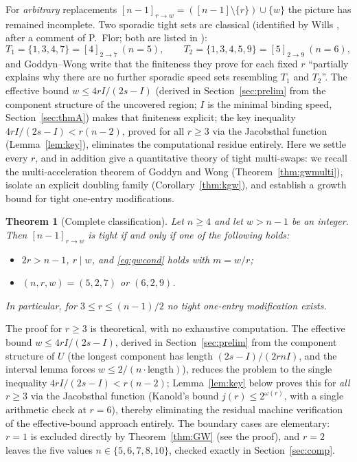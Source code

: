 \documentclass[11pt]{article}
\newtheorem{theorem}{Theorem}[section]
\theoremstyle{definition}
\begin{document}
For \emph{arbitrary} replacements $[n-1]_{r\to w}=([n-1]\setminus\{r\})\cup
\{w\}$ the picture has remained incomplete. Two sporadic tight sets are
classical (identified by Wills \cite{Wills1968}, after a comment of
P.~Flor; both are listed in \cite{GoddynWong2006}):
\[
T_1=\{1,3,4,7\}=[4]_{2\to7}\ (n=5),\qquad
T_2=\{1,3,4,5,9\}=[5]_{2\to9}\ (n=6),
\]
and Goddyn--Wong write that the finiteness they prove for each fixed $r$
``partially explains why there are no further sporadic speed sets
resembling $T_1$ and $T_2$''.  The effective bound $w\le4rI/(2s-I)$
(derived in Section~\ref{sec:prelim} from the component structure of the
uncovered region; $I$ is the minimal binding speed, Section~\ref{sec:thmA})
makes that finiteness explicit; the key
inequality $4rI/(2s-I)<r(n-2)$, proved for all $r\ge3$ via the
Jacobsthal function (Lemma~\ref{lem:key}), eliminates the computational
residue entirely.  Here we settle every $r$, and
in addition give a quantitative theory of tight multi-swaps: we recall
the multi-acceleration theorem of Goddyn and Wong
(Theorem~\ref{thm:gwmulti}), isolate an explicit doubling family
(Corollary~\ref{thm:kgw}), and establish a growth bound for tight
one-entry modifications.

\begin{theorem}[Complete classification]\label{thm:A}
Let $n\ge4$ and let $w>n-1$ be an integer. Then $[n-1]_{r\to w}$ is tight if
and only if one of the following holds:
\begin{itemize}
\item[\emph{(i)}] $2r>n-1$, $r\mid w$, and \eqref{eq:gwcond} holds with
$m=w/r$;
\item[\emph{(ii)}] $(n,r,w)=(5,2,7)$ or $(6,2,9)$.
\end{itemize}
In particular, for $3\le r\le(n-1)/2$ no tight one-entry modification exists.
\end{theorem}

The proof for $r\ge3$ is theoretical, with no exhaustive computation.
The effective
bound $w\le4rI/(2s-I)$, derived in Section~\ref{sec:prelim} from the
component structure of $U$ (the longest component has length
$(2s-I)/(2rnI)$, and the interval lemma forces
$w\le2/(n\cdot\text{length})$), reduces the problem to the single
inequality $4rI/(2s-I)<r(n-2)$; Lemma~\ref{lem:key} below proves this
for \emph{all} $r\ge3$ via the Jacobsthal function (Kanold's bound
$j(r)\le2^{\omega(r)}$, with a single arithmetic check at $r=6$), thereby
eliminating the residual machine verification of the effective-bound
approach entirely.  The boundary cases are elementary: $r=1$ is excluded
directly by Theorem~\ref{thm:GW} (see the proof), and $r=2$ leaves the
five values $n\in\{5,6,7,8,10\}$, checked exactly in
Section~\ref{sec:comp}.
\end{document}
